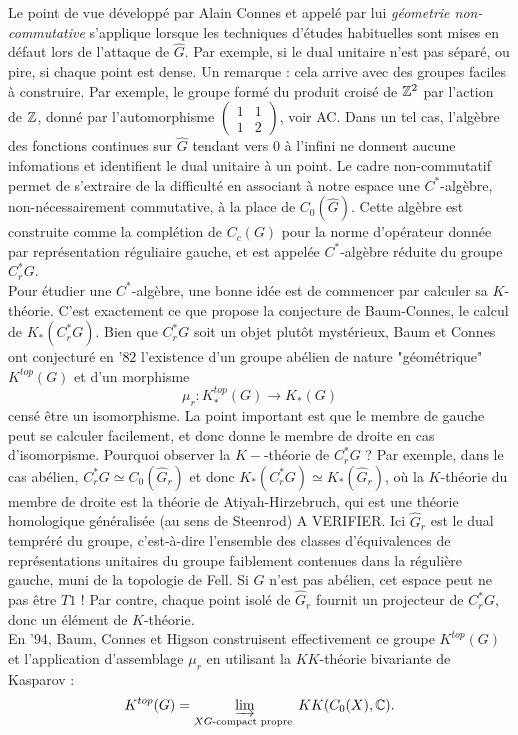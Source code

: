 Le point de vue développé par Alain Connes et appelé par lui \textit{géometrie non-commutative} s'applique lorsque les techniques d'études habituelles sont mises en défaut lors de l'attaque de $\hat G$. Par exemple, si le dual unitaire n'est pas séparé, ou pire, si chaque point est dense. Un remarque : cela arrive avec des groupes faciles à construire. Par exemple, le groupe formé du produit croisé de $\mathbb Z^2$ par l'action de $\mathbb Z$, donné par l'automorphisme $\begin{pmatrix}1 & 1 \\ 1 & 2 \end{pmatrix}$, voir AC. Dans un tel cas, l'algèbre des fonctions continues sur $\hat G$ tendant vers $0$ à l'infini ne donnent aucune infomations et identifient le dual unitaire à un point. Le cadre non-commutatif permet de s'extraire de la difficulté en associant à notre espace une $C^*$-algèbre, non-nécessairement commutative, à la place de $C_0(\hat G)$. Cette algèbre est construite comme la complétion de $C_c(G)$ pour la norme d'opérateur donnée par représentation réguliaire gauche, et est appelée $C^*$-algèbre réduite du groupe $C_r^*G$.\\

Pour étudier une $C^*$-algèbre, une bonne idée est de commencer par calculer sa $K$-théorie. C'est exactement ce que propose la conjecture de Baum-Connes, le calcul de $K_*(C_r^* G)$. Bien que $C_r^* G $ soit un objet plutôt mystérieux, Baum et Connes ont conjecturé en '$82$ l'existence d'un groupe abélien de nature "géométrique" $K^{top}(G)$ et d'un morphisme 
\[\mu_r : K^{top}_*(G)\rightarrow K_*(G)\]
censé être un isomorphisme. La point important est que le membre de gauche peut se calculer facilement, et donc donne le membre de droite en cas d'isomorpisme. Pourquoi observer la $K-$-théorie de $C^*_r G$ ? Par exemple, dans le cas abélien, $C_r^*G\simeq C_0(\hat G_r)$ et donc $K_*(C_r^*G)\simeq K_*(\hat G_r)$, où la $K$-théorie du membre de droite est la théorie de Atiyah-Hirzebruch, qui est une théorie homologique généralisée (au sens de Steenrod) A VERIFIER. Ici $\hat G_r$ est le dual tempréré du groupe, c'est-à-dire l'ensemble des classes d'équivalences de représentations unitaires du groupe faiblement contenues dans la régulière gauche, muni de la topologie de Fell. Si $G$ n'est pas abélien, cet espace peut ne pas être $T1$ ! Par contre, chaque point isolé de $\hat G_r$ fournit un projecteur de $C_r^* G$, donc un élément de $K$-théorie. \\

En '$94$, Baum, Connes et Higson construisent effectivement ce groupe $K^{top}(G)$ et l'application d'assemblage $\mu_r$ en utilisant la $KK$-théorie bivariante de Kasparov : 
\[K^{top}(G)=\varinjlim_{X G\text{-compact propre }} KK(C_0(X), \mathbb C).\]

